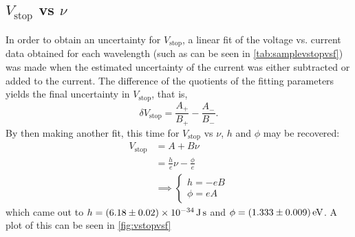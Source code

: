 \documentclass{article}
\begin{document}
\subsection{$V_\text{stop}$ vs $\nu$}
In order to obtain an uncertainty for $V_\text{stop}$, a linear fit of the voltage vs. current data obtained for each wavelength (such as can be seen in \autoref{tab:samplevstopvsf}) was made when the estimated uncertainty of the current was either subtracted or added to the current. The difference of the quotients of the fitting parameters yields the final uncertainty in $V_\text{stop}$, that is,
\begin{equation*}
    \delta V_\text{stop} = \frac{A_+}{B_+} - \frac{A_-}{B_-}.
\end{equation*}
By then making another fit, this time for $V_\text{stop}$ vs $\nu$, $h$ and $\phi$ may be recovered:
\begin{equation*}
    \begin{aligned}
        V_\text{stop} &= A + B\nu \\
                &= \frac{h}{e}\nu - \frac{\phi}{e} \\
                &\implies \begin{cases}
                    h = -eB \\
                    \phi = eA
                \end{cases}
    \end{aligned}
\end{equation*}
which came out to $h = \qty{6.18 \pm 0.02e-34}{J.s}$ and $\phi = \qty{1.333 \pm 0.009}{eV}$. A plot of this can be seen in \autoref{fig:vstopvsf}
\end{document}
